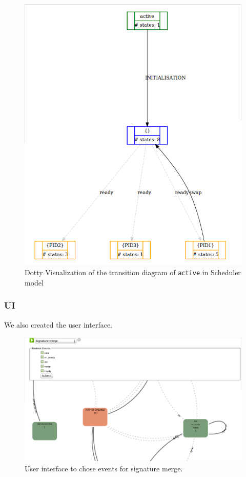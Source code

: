 \begin{figure}[h!]
\centering
\includegraphics[width=15cm]{bilder/transdiag-dotty-wo.png}
\caption{Dotty Visualization of the transition diagram of \texttt{active} in Scheduler model}
\label{transdiagDotty}
\end{figure}

\subsubsection{UI} 
We also created the user interface.

\begin{figure}[h!]
\centering
\includegraphics[width=15cm]{bilder/sigmerge1.png}
\caption{User interface to chose events for signature merge.}
\label{sigMergeUI}
\end{figure}



